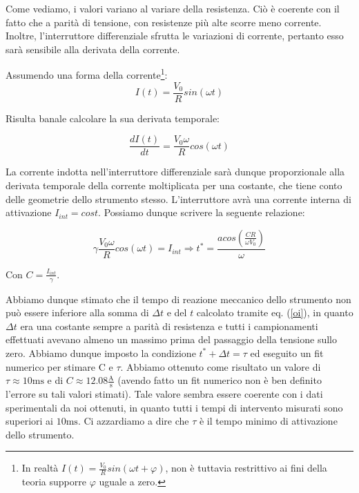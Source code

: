 Come vediamo, i valori variano al variare della resistenza. Ciò è coerente con il fatto che a parità di tensione, con resistenze più alte scorre meno corrente. Inoltre, l'interruttore differenziale sfrutta le variazioni di corrente, pertanto esso sarà sensibile alla derivata della corrente.

Assumendo una forma della corrente\footnote{In realtà $I(t)=\frac{V_0}{R}sin(\omega t + \varphi)$, non è tuttavia restrittivo ai fini della teoria supporre $\varphi$ uguale a zero.}:
\begin{equation}
I(t)=\frac{V_0}{R}sin(\omega t)
\label{corrente}
\end{equation}

Risulta banale calcolare la sua derivata temporale:

\begin{equation}
\frac{dI(t)}{dt}=\frac{V_0 \omega}{R}cos(\omega t)
\end{equation}

La corrente indotta nell'interruttore differenziale sarà dunque proporzionale alla derivata temporale della corrente moltiplicata per una costante, che tiene conto delle geometrie dello strumento stesso. L'interruttore avrà una corrente interna di attivazione $I_{int}=cost$. Possiamo dunque scrivere la seguente relazione:

\begin{equation}
\gamma \frac{V_0 \omega}{R}cos(\omega t)=I_{int} \Rightarrow t^*=\frac{acos(\frac{C R}{\omega V_0})}{\omega }
\label{oi}
\end{equation} 

Con $C=\frac{I_{int}}{\gamma}$.

Abbiamo dunque stimato che il tempo di reazione meccanico dello strumento non può essere inferiore alla somma di $\Delta t$ e del $t$ calcolato tramite eq. (\ref{oi}), in quanto $\Delta t$ era una costante sempre a parità di resistenza e tutti i campionamenti effettuati avevano almeno un massimo prima del passaggio della tensione sullo zero. Abbiamo dunque imposto la condizione $t^*+\Delta t = \tau$ ed eseguito un fit numerico per stimare C e $\tau$. Abbiamo ottenuto come risultato un valore di $\tau \approx 10 \si{\milli \second}$ e di $C \approx 12.08 \frac{\si{\ampere}}{\si{\second}}$ (avendo fatto un fit numerico non è ben definito l'errore su tali valori stimati). Tale valore sembra essere coerente con i dati sperimentali da noi ottenuti, in quanto tutti i tempi di intervento misurati sono superiori ai $10 \si{\milli \second}$. Ci azzardiamo a dire che $\tau$ è il tempo minimo di attivazione dello strumento. 
 
